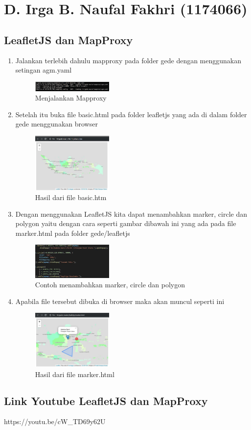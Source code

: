 \section{D. Irga B. Naufal Fakhri (1174066)}
\subsection{LeafletJS dan MapProxy}
\begin{enumerate}
    \item Jalankan terlebih dahulu mapproxy pada folder gede dengan menggunakan setingan agm.yaml
        \hfill\break
        \begin{figure}[H]
        \includegraphics[width=4cm]{figures/tugas5/1174066/1.jpg}
        \centering
        \caption{Menjalankan Mapproxy}
        \end{figure}
    \item Setelah itu buka file basic.html pada folder leafletjs yang ada di dalam folder gede menggunakan browser
        \hfill\break
        \begin{figure}[H]
        \includegraphics[width=4cm]{figures/tugas5/1174066/3.jpg}
        \centering
        \caption{Hasil dari file basic.htm}
        \end{figure}
   \item Dengan menggunakan LeafletJS kita dapat menambahkan marker, circle dan polygon yaitu dengan cara seperti gambar dibawah ini yang ada pada file marker.html pada folder gede/leafletjs
        \hfill\break
        \begin{figure}[H]
        \includegraphics[width=4cm]{figures/tugas5/1174066/4.jpg}
        \centering
        \caption{Contoh menambahkan marker, circle dan polygon}
        \end{figure}
   \item Apabila file tersebut dibuka di browser maka akan muncul seperti ini
        \hfill\break
        \begin{figure}[H]
        \includegraphics[width=4cm]{figures/tugas5/1174066/5.jpg}
        \centering
        \caption{Hasil dari file marker.html}
        \end{figure}
\end{enumerate}
\subsection{Link Youtube LeafletJS dan MapProxy}
https://youtu.be/cW\_TD69y62U
